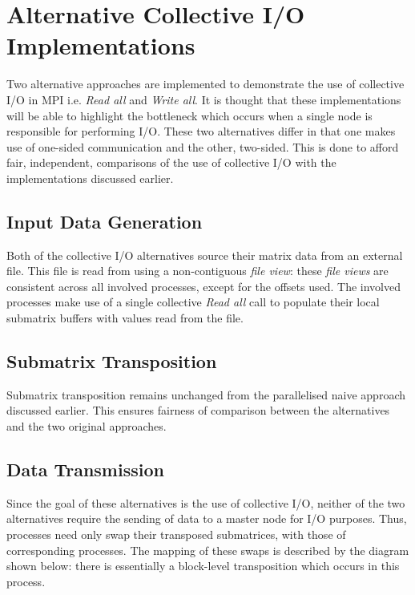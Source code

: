 \documentclass[journal,10pt,a4paper]{IEEEtran}
\begin{document}
\section{Alternative Collective I/O Implementations}

Two alternative approaches are implemented to demonstrate the use of collective I/O in MPI \cite{io,io2} i.e. \textit{Read all} and \textit{Write all}. It is thought that these implementations will be able to highlight the bottleneck which occurs when a single node is responsible for performing I/O. These two alternatives differ in that one makes use of one-sided communication and the other, two-sided. This is done to afford fair, independent, comparisons of the use of collective I/O with the implementations discussed earlier.

\subsection{Input Data Generation}

Both of the collective I/O alternatives source their matrix data from an external file. This file is read from using a non-contiguous \textit{file view}: these \textit{file views} are consistent across all involved processes, except for the offsets used. The involved processes make use of a single collective \textit{Read all} call to populate their local submatrix buffers with values read from the file. 



\subsection{Submatrix Transposition}
Submatrix transposition remains unchanged from the parallelised naive approach discussed earlier. This ensures fairness of comparison between the alternatives and the two original approaches.

\subsection{Data Transmission}

Since the goal of these alternatives is the use of collective I/O, neither of the two alternatives require the sending of data to a master node for I/O purposes. Thus, processes need only swap their transposed submatrices, with those of corresponding processes. The mapping of these swaps is described by the diagram shown below: there is essentially a block-level transposition which occurs in this process.
\end{document}
